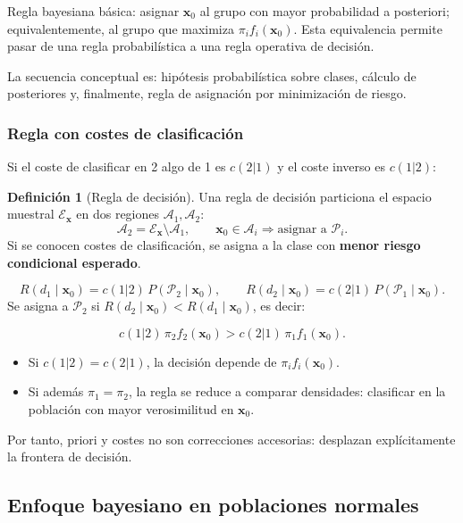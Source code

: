 \documentclass[12pt, a4paper]{article}
\theoremstyle{plain}
\theoremstyle{definition}
\newtheorem{definicion}[teorema]{Definición}
\theoremstyle{remark}
\begin{document}
Regla bayesiana básica: asignar $\mathbf{x}_0$ al grupo con mayor probabilidad
a posteriori; equivalentemente, al grupo que maximiza
$\pi_i f_i(\mathbf{x}_0)$. Esta equivalencia permite pasar de una regla
probabilística a una regla operativa de decisión.

La secuencia conceptual es: hipótesis probabilística sobre clases, cálculo de
posteriores y, finalmente, regla de asignación por minimización de riesgo.

\subsubsection{Regla con costes de clasificación}

Si el coste de clasificar en 2 algo de 1 es $c(2|1)$ y el coste inverso es
$c(1|2)$:
\begin{definicion}[Regla de decisión]
Una regla de decisión particiona el espacio muestral
$\mathcal{E}_{\mathbf{x}}$ en dos regiones $\mathcal{A}_1,\mathcal{A}_2$:
\[
  \mathcal{A}_2=\mathcal{E}_{\mathbf{x}}\setminus\mathcal{A}_1,\qquad
  \mathbf{x}_0\in\mathcal{A}_i \Rightarrow \text{asignar a } \mathcal{P}_i.
\]
Si se conocen costes de clasificación, se asigna a la clase con
\textbf{menor riesgo condicional esperado}.
\end{definicion}

\[
  R(d_1\mid \mathbf{x}_0)=c(1|2)\,P(\mathcal{P}_2\mid\mathbf{x}_0),\qquad
  R(d_2\mid \mathbf{x}_0)=c(2|1)\,P(\mathcal{P}_1\mid\mathbf{x}_0).
\]
Se asigna a $\mathcal{P}_2$ si $R(d_2\mid\mathbf{x}_0)<R(d_1\mid\mathbf{x}_0)$,
es decir:
\begin{mdframed}[style=resultado]
\[
  c(1|2)\,\pi_2f_2(\mathbf{x}_0) > c(2|1)\,\pi_1f_1(\mathbf{x}_0).
\]
\end{mdframed}

\begin{itemize}
  \item Si $c(1|2)=c(2|1)$, la decisión depende de $\pi_i f_i(\mathbf{x}_0)$.
  \item Si además $\pi_1=\pi_2$, la regla se reduce a comparar densidades:
        clasificar en la población con mayor verosimilitud en $\mathbf{x}_0$.
\end{itemize}

Por tanto, priori y costes no son correcciones accesorias: desplazan
explícitamente la frontera de decisión.

\subsection{Enfoque bayesiano en poblaciones normales}
\end{document}

